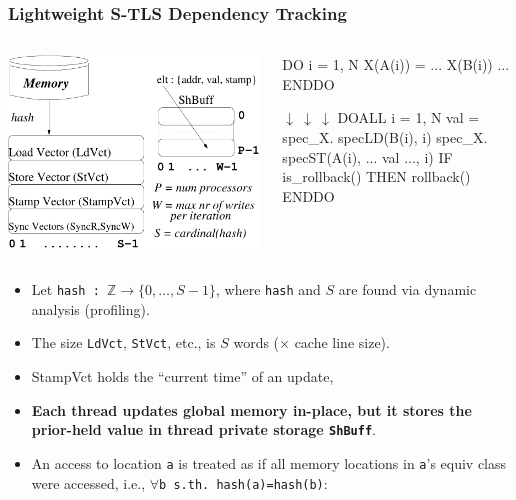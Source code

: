 \documentclass{beamer}
\newcommand{\emp}[1]{\textcolor{DikuRed}{ #1}}
\newcommand{\emphh}[1]{\textcolor{CosGreen}{ #1}}
\newcommand{\mymath}[1]{$ #1 $}
\begin{document}
\begin{frame}[fragile,t]
  \frametitle{Lightweight S-TLS Dependency Tracking}

\begin{columns}
\includegraphics[width=28ex]{FigsTLS/SpecMem1.pdf}
\vspace{-2ex}
\begin{colorcode}
\emp{DO} i = 1, N
  \emp{X(A(i))} = ... \emp{X(B(i))} ...
ENDDO

\mymath{\downarrow \ \downarrow \ \downarrow}
\emphh{DOALL} i = 1, N
  val = spec_X.\emphh{specLD(B(i), i)}
  spec_X.\emphh{specST(A(i), ... val ..., i)}
  IF is_rollback() THEN rollback()
ENDDO
\end{colorcode}
\end{columns}
\medskip\pause

\begin{itemize}
    \item Let {\tt hash : $\mathbb{Z} \rightarrow \{0,\ldots,S-1\}$},
            where {\tt hash} and $S$ are found via dynamic analysis (profiling).
    \item The size {\tt LdVct}, {\tt StVct}, etc., is $S$ words 
            ($\times$ cache line size).
    \item \emp{StampVct} holds the ``current time'' of an update,
    \item \emp{\bf Each thread updates global memory in-place, but it stores the
            prior-held value in thread private storage {\tt ShBuff}}. 
    \item An access to location {\tt a} is treated as if all 
            memory locations in {\tt a}'s equiv class were accessed, 
            i.e., {\tt$\forall$b s.th. hash(a)=hash(b)}: 
\end{itemize}

\end{frame}
\end{document}
